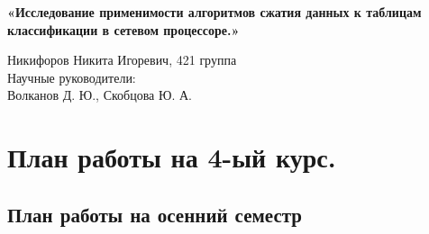 \documentclass[a4peper, 12pt, titlepage, finall]{extreport}
\begin{document}
\begin{center}
    {\large \bf «Исследование применимости алгоритмов сжатия данных к таблицам классификации в сетевом процессоре.»}

\end{center}
        \begin{flushright}
            {Никифоров Никита Игоревич, 421 группа}\\
            {Научные руководители:\\ Волканов Д. Ю., Скобцова Ю. А.}
        \end{flushright}
    \section{План работы на 4-ый курс.}
        \subsection{План работы на осенний семестр}
\end{document}
